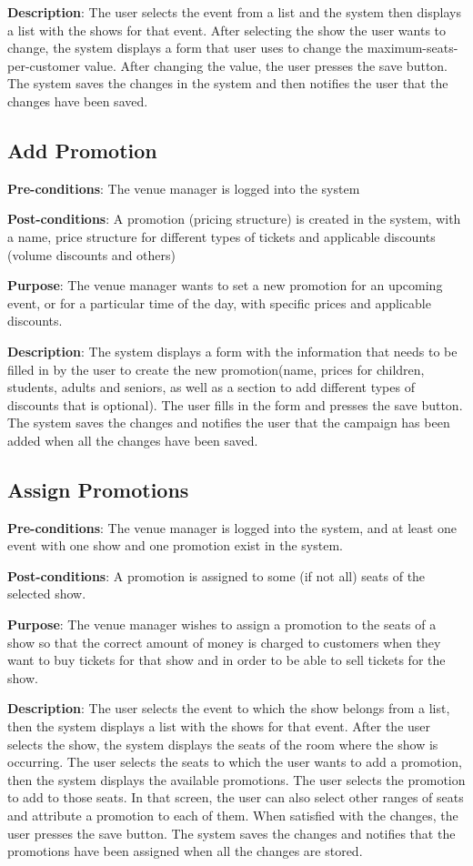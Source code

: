\textbf{Description}: The user selects the event from a list and the
system then displays a list with the shows for that event. After
selecting the show the user wants to change, the system displays a
form that user uses to change the maximum-seats-per-customer value.
After changing the value, the user presses the save button. The
system saves the changes in the system and then notifies the user
that the changes have been saved.

\subsection{Add Promotion}
\textbf{Pre-conditions}: The venue manager is logged into the system

\textbf{Post-conditions}: A promotion (pricing structure) is created
in the system, with a name, price structure for different types of
tickets and applicable discounts (volume discounts and others)

\textbf{Purpose}: The venue manager wants to set a new promotion for
an upcoming event, or for a particular time of the day, with specific
prices and applicable discounts.

\textbf{Description}: The system displays a form with the information
that needs to be filled in by the user to create the new promotion(name,
prices for children, students, adults and seniors, as well as a section
to add different types of discounts that is optional). The user fills in
the form and presses the save button. The system saves the changes and
notifies the user that the campaign has been added when all the changes
have been saved.

\subsection{Assign Promotions}
\textbf{Pre-conditions}: The venue manager is logged into the system,
and at least one event with one show and one promotion exist in the
system.

\textbf{Post-conditions}: A promotion is assigned to some (if not all) seats of
the selected show.

\textbf{Purpose}: The venue manager wishes to assign a promotion to the
seats of a show so that the correct amount of money is charged to
customers when they want to buy tickets for that show and in order
to be able to sell tickets for the show.

\textbf{Description}: The user selects the event to which the show
belongs from a list, then the system displays a list with the shows
for that event. After the user selects the show, the system displays
the seats of the room where the show is occurring. The user selects
the seats to which the user wants to add a promotion, then the
system displays the available promotions. The user selects the
promotion to add to those seats. In that screen, the user can also
select other ranges of seats and attribute a promotion to each of them.
When satisfied with the changes, the user presses the save button.
The system saves the changes and notifies that the promotions have
been assigned when all the changes are stored.

